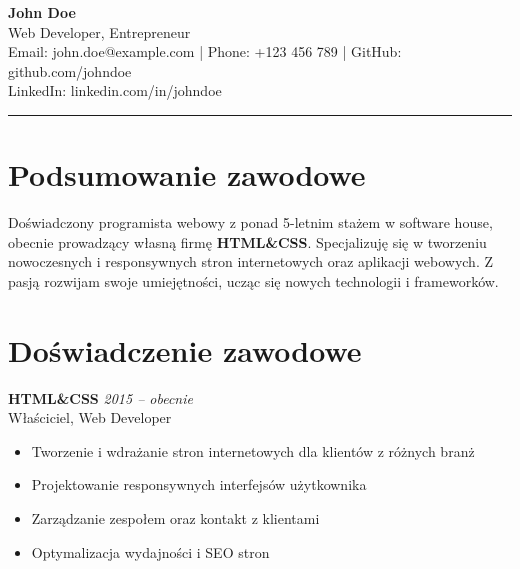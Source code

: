 \documentclass[a4paper,10pt]{article}
\begin{document}
\begin{center}
    {\LARGE \textbf{John Doe}} \\
    {\large Web Developer, Entrepreneur} \\
    Email: john.doe@example.com | Phone: +123 456 789 | GitHub: github.com/johndoe \\
    LinkedIn: linkedin.com/in/johndoe
\end{center}

\noindent\rule{\textwidth}{1pt}

\section*{Podsumowanie zawodowe}
Doświadczony programista webowy z ponad 5-letnim stażem w software house, obecnie prowadzący własną firmę \textbf{HTML\&CSS}. Specjalizuję się w tworzeniu nowoczesnych i responsywnych stron internetowych oraz aplikacji webowych. Z pasją rozwijam swoje umiejętności, ucząc się nowych technologii i frameworków.

\section*{Doświadczenie zawodowe}
\textbf{HTML\&CSS} \hfill \textit{2015 – obecnie} \\
Właściciel, Web Developer
\begin{itemize}
    \item Tworzenie i wdrażanie stron internetowych dla klientów z różnych branż
    \item Projektowanie responsywnych interfejsów użytkownika
    \item Zarządzanie zespołem oraz kontakt z klientami
    \item Optymalizacja wydajności i SEO stron
\end{itemize}
\par
\end{document}
